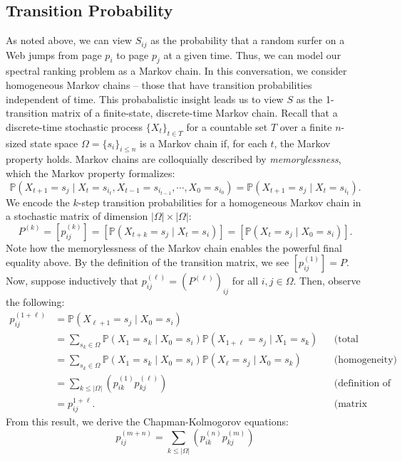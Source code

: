 \documentclass[12pt]{article}
\newcommand{\iterate}[2]{#1^{(#2)}}
\newcommand{\parens}[1]{ \left( #1 \right) }
\newcommand{\prob}{\mathbb{P}}
\begin{document}
\subsection{Transition Probability}
As noted above, we can view $S_{ij}$ as the probability that a random surfer on
a Web jumps from page $p_i$ to page $p_j$ at a given time. Thus, we can model
our spectral ranking problem as a Markov chain. In this conversation, we
consider homogeneous Markov chains -- those that have transition probabilities
independent of time. This probabalistic insight leads us to view $S$ as the
1-transition matrix of a finite-state, discrete-time Markov chain. Recall that a
discrete-time stochastic process $\{X_t\}_{t \in T}$ for a countable set $T$
over a finite $n$-sized state space $\Omega = \{s_i\}_{i\leq n}$ is a Markov chain if, for
each $t$, the Markov property holds. Markov chains are colloquially described by
\textit{memorylessness}, which the Markov property formalizes:
\begin{equation*}
  \prob(X_{t+1} = s_j \mid X_t = s_{i_t}, X_{t-1} = s_{i_{t-1}},\cdots, X_0 =
s_{i_0}) = \prob(X_{t+1} = s_j \mid X_t=s_{i_{t}}).
\end{equation*}
We encode the $k$-step transition probabilities for a homogeneous Markov chain
in a stochastic matrix of dimension $|\Omega| \times |\Omega|$:
\begin{equation}
  \iterate{P}{k} = [ \iterate{p}{k}_{ij} ] = [ \prob(X_{t+k} = s_j \mid X_t =
s_i) ] = [ \prob(X_{t} = s_j \mid X_0 = s_i) ].
\end{equation}
Note how the memorylessness of the Markov chain enables the powerful final
equality above. By the definition of the transition matrix, we see
$ [ \iterate{p}{1}_{ij} ] = P$. Now, suppose inductively that
$\iterate{p}{\ell}_{ij} = \parens{\iterate{P}{\ell}}_{ij}$ for all
$i, j \in \Omega$. Then, observe the following:
\begin{align*}
  \iterate{p}{1+\ell}_{ij} &= \prob(X_{\ell+1} = s_j \mid X_0 = s_i) \\
                           &= \sum_{s_k\in\Omega}{\prob(X_1 = s_k \mid X_0 = s_i) \prob(X_{1+\ell} = s_j \mid
                             X_1 = s_k)} && \text{(total probability)} \\
                           &= \sum_{s_k\in\Omega}{\prob(X_1 = s_k \mid X_0 = s_i) \prob(X_{\ell} = s_j \mid X_0 = s_k)} &&
                                                                                                                           \text{(homogeneity)} \\
                           &= \sum_{k\leq
                             |\Omega|}{\parens{\iterate{p}{1}_{ik}\iterate{p}{\ell}_{kj}}}
                           && \text{(definition of transition matrix)}\\
                           &= p^{1+\ell}_{ij}. && \text{(matrix multiplication)}
\end{align*}
From this result, we derive the Chapman-Kolmogorov equations:
\begin{equation}
  \iterate{p}{m+n}_{ij} = \sum_{k\leq |\Omega|}{\parens{\iterate{p}{n}_{ik} \iterate{p}{m}_{kj}}}
\end{equation}
\end{document}
